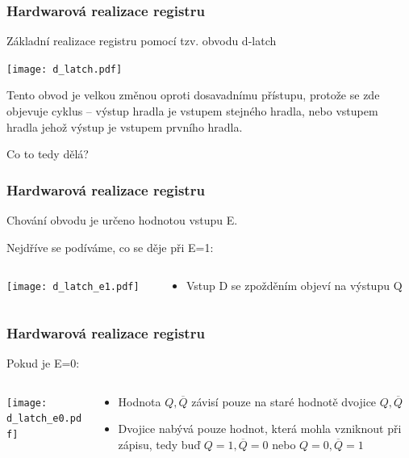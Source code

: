 \documentclass{beamer}
\begin{document}
\begin{frame}
\frametitle{Hardwarová realizace registru}

Základní realizace registru pomocí tzv. obvodu d-latch
\begin{center}
\texttt{[image: d\_latch.pdf]}
\end{center}

Tento obvod je velkou změnou oproti dosavadnímu přístupu, protože se zde objevuje cyklus -- výstup hradla je vstupem stejného hradla, nebo vstupem hradla jehož výstup je vstupem prvního hradla.

Co to tedy dělá?

\end{frame}

\begin{frame}
\frametitle{Hardwarová realizace registru}

Chování obvodu je určeno hodnotou vstupu E.

Nejdříve se podíváme, co se děje při E=1:
\begin{columns}
\begin{column}{0.45\textwidth}
\begin{center}
\texttt{[image: d\_latch\_e1.pdf]}
\end{center}
\end{column}
\begin{column}{0.5\textwidth}  
\begin{itemize}
\item Vstup D se zpožděním objeví na výstupu Q
\end{itemize}
\end{column}
\end{columns}

\end{frame}

\begin{frame}
\frametitle{Hardwarová realizace registru}

Pokud je E=0:
\begin{columns}
\begin{column}{0.45\textwidth}
\begin{center}
\texttt{[image: d\_latch\_e0.pdf]}
\end{center}
\end{column}
\begin{column}{0.5\textwidth}  
\begin{itemize}
\item Hodnota $Q,\overline{Q}$ závisí pouze na staré hodnotě dvojice $Q,\overline{Q}$
\item Dvojice nabývá pouze hodnot, která mohla vzniknout při zápisu, tedy buď $Q=1,\overline{Q}=0$ nebo $Q=0,\overline{Q}=1$
\end{itemize}
\end{column}
\end{columns}

\end{frame}
\end{document}

